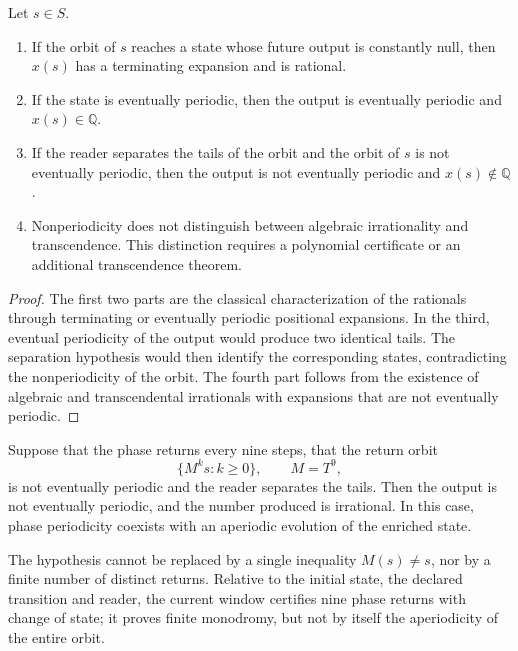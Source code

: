 \begin{theorem}
\label{thm:clasificacion-retorno-fase}
Let \(s\in S\).
\begin{enumerate}
  \item If the orbit of \(s\) reaches a state whose future output is
  constantly null, then \(x(s)\) has a terminating expansion and is
  rational.
  \item If the state is eventually periodic, then the output is
  eventually periodic and \(x(s)\in\mathbb Q\).
  \item If the reader separates the tails of the orbit and the orbit of \(s\) is not
  eventually periodic, then the output is not eventually periodic
  and \(x(s)\notin\mathbb Q\).
  \item Nonperiodicity does not distinguish between algebraic irrationality and
  transcendence. This distinction requires a polynomial certificate or an
  additional transcendence theorem.
\end{enumerate}
\end{theorem}

\begin{proof}
The first two parts are the classical characterization of the rationals through terminating or eventually periodic positional expansions. In the third, eventual periodicity of the output would produce two identical tails. The separation hypothesis would then identify the corresponding states, contradicting the nonperiodicity of the orbit. The fourth part follows from the existence of algebraic and transcendental irrationals with expansions that are not eventually periodic.
\end{proof}

\begin{corollary}
Suppose that the phase returns every nine steps, that the return orbit
\[
 \{M^ks:k\geq0\},\qquad M=T^9,
\]
is not eventually periodic and the reader separates the tails. Then the
output is not eventually periodic, and the number produced is irrational. In this
case, phase periodicity coexists with an aperiodic evolution of the
enriched state.
\end{corollary}

The hypothesis cannot be replaced by a single inequality \(M(s)\ne s\), nor
by a finite number of distinct returns. Relative to the initial state,
the declared transition and reader, the current window certifies nine
phase returns with change of state; it proves finite monodromy, but not
by itself the aperiodicity of the entire orbit.

